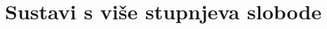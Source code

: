 \documentclass{rgn}
\begin{document}
\chapter{Sustavi s više stupnjeva slobode}
        
        
        
        
        
\end{document}
